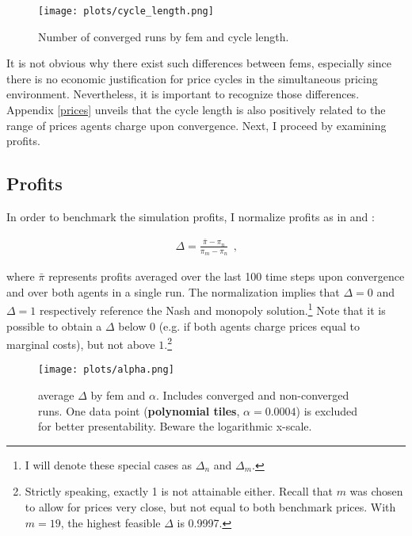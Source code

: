 \begin{figure}
	\texttt{[image: plots/cycle\_length.png]}
	\caption{Number of converged runs by \gls{fem} and cycle length.}
	\label{cycle_length}
\end{figure}


It is not obvious why there exist such differences between \gls{fem}s, especially since there is no economic justification for price cycles in the simultaneous pricing environment. Nevertheless, it is important to recognize those differences.  Appendix \ref{prices} unveils that the cycle length is also positively related to the range of prices agents charge upon convergence. Next, I proceed by examining profits.

\subsection{Profits}\label{profits}

In order to benchmark the simulation profits, I normalize profits as in \textcite{calvano_artificial_2020} and \textcite{hettich_algorithmic_2021}:

\begin{gather}
\Delta = \frac{\bar{\pi} - \pi_n}{\pi_m - \pi_n} ~~ \text{,}
\end{gather}

where $\bar{\pi}$ represents profits averaged over the last 100 time steps upon convergence and over both agents in a single run. The normalization implies that $\Delta = 0$ and $\Delta = 1$ respectively reference the Nash and monopoly solution.\footnote{I will denote these special cases as $\Delta_n$ and $\Delta_m$.} Note that it is possible to obtain a $\Delta$ below $0$ (e.g. if both agents charge prices equal to marginal costs), but not above $1$.\footnote{Strictly speaking, exactly 1 is not attainable either. Recall that $m$ was chosen to allow for prices very close, but not equal to both benchmark prices. With $m = 19$, the highest feasible $\Delta$ is 0.9997.}

\begin{figure}
	\texttt{[image: plots/alpha.png]}
	\caption[average $\Delta$ by \gls{fem} and $\alpha$]{average $\Delta$ by \gls{fem} and $\alpha$. Includes converged and non-converged runs. One data point (\textbf{polynomial tiles}, $\alpha = 0.0004$) is excluded for better presentability. Beware the logarithmic x-scale.}
	\label{alpha}
\end{figure}

